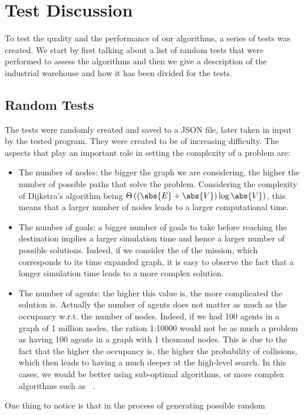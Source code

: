 \chapter{Test Discussion}
\label{ch:discussion}
To test the quality and the performance of our algorithms, a series of tests
was created. We start by first talking about a list of random tests that were
performed to assess the algorithms and then we give a description of the
industrial warehouse and how it has been divided for the tests. 
%
%
%
\section{Random Tests}
The tests were randomly created and saved to a JSON file, later taken in input
by the tested program. They were created to be of increasing difficulty. The
aspects that play an important role in setting the complexity of a 
problem are:
\begin{itemize}
  \item The number of nodes: the bigger the graph we are considering, the
    higher the number of possible paths that solve the problem. Considering the
    complexity of Dijkstra's algorithm being
    $\Theta\left((\abs{E}+\abs{V})\log{\abs{V}}\right)$, this means that a larger
    number of nodes leads to a larger computational time. 
  \item The number of goals: a bigger number of goals to take before reaching
    the destination implies a larger simulation time and hence a larger number
    of possible solutions. Indeed, if we consider the  of the
    mission, which corresponds to its time expanded graph, it is easy to
    observe the fact that a longer simulation time leads to a more complex
    solution.  
  \item The number of agents: the higher this value is, the more complicated
    the solution is. Actually the number of agents does not matter as much as
    the occupancy w.r.t. the number of nodes. Indeed, if we had 100 agents in a
    graph of 1 million nodes, the ration 1:10000 would not be as much a problem
    as having 100 agents in a graph with 1 thousand nodes. This is due to the
    fact that the higher the occupancy is, the higher the probability of
    collisions, which then leads to having a much deeper  at the
    high-level search. In this cases, we would be better using sub-optimal
    algorithms, or more complex algorithms such as ~\cite{CBS}. 
\end{itemize}
One thing to notice is that in the process of generating possible random
